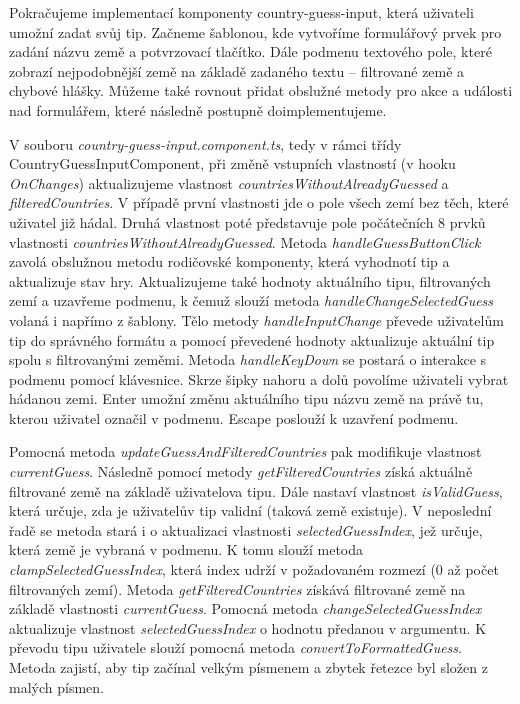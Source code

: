 Pokračujeme implementací komponenty country-guess-input, která uživateli umožní zadat svůj tip. 
Začneme šablonou, kde vytvoříme formulářový prvek pro zadání názvu země a potvrzovací tlačítko. 
Dále podmenu textového pole, které zobrazí nejpodobnější země na základě zadaného textu -- filtrované země a chybové hlášky. 
Můžeme také rovnout přidat obslužné metody pro akce a události nad formulářem, které následně postupně doimplementujeme.

V souboru \emph{country-guess-input.component.ts}, tedy v rámci třídy CountryGuessInputComponent, při změně vstupních vlastností (v hooku \emph{OnChanges}) aktualizujeme vlastnost \emph{countriesWithoutAlreadyGuessed} a \emph{filteredCountries}. 
V případě první vlastnosti jde o pole všech zemí bez těch, které uživatel již hádal. Druhá vlastnost poté představuje pole počátečních 8 prvků vlastnosti \emph{countriesWithoutAlreadyGuessed}. 
Metoda \emph{handleGuessButtonClick} zavolá obslužnou metodu rodičovské komponenty, která vyhodnotí tip a aktualizuje stav hry. 
Aktualizujeme také hodnoty aktuálního tipu, filtrovaných zemí a uzavřeme podmenu, k čemuž slouží metoda \emph{handleChangeSelectedGuess} volaná i napřímo z šablony. 
Tělo metody \emph{handleInputChange} převede uživatelům tip do správného formátu a pomocí převedené hodnoty aktualizuje aktuální tip spolu s filtrovanými zeměmi.
Metoda \emph{handleKeyDown} se postará o interakce s podmenu pomocí klávesnice. Skrze šipky nahoru a dolů povolíme uživateli vybrat hádanou zemi. 
Enter umožní změnu aktuálního tipu názvu země na právě tu, kterou uživatel označil v podmenu. Escape poslouží k uzavření podmenu.

Pomocná metoda \emph{updateGuessAndFilteredCountries} pak modifikuje vlastnost \emph{currentGuess}. 
Následně pomocí metody \emph{getFilteredCountries} získá aktuálně filtrované země na základě uživatelova tipu. 
Dále nastaví vlastnost \emph{isValidGuess}, která určuje, zda je uživatelův tip validní (taková země existuje). 
V neposlední řadě se metoda stará i o aktualizaci vlastnosti \emph{selectedGuessIndex}, jež určuje, která země je vybraná v podmenu. 
K tomu slouží metoda \emph{clampSelectedGuessIndex}, která index udrží v požadovaném rozmezí (0 až počet filtrovaných zemí).
Metoda \emph{getFilteredCountries} získává filtrované země na základě vlastnosti \emph{currentGuess}. 
Pomocná metoda \emph{changeSelectedGuessIndex} aktualizuje vlastnost \emph{selectedGuessIndex} o hodnotu předanou v argumentu. 
K převodu tipu uživatele slouží pomocná metoda \emph{convertToFormattedGuess}. Metoda zajistí, aby tip začínal velkým písmenem a zbytek řetezce byl složen z malých písmen.

